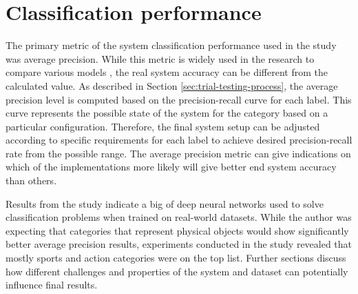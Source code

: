 
\section{Classification performance}
The primary metric of the system classification performance used in the study was average precision. While this metric is widely used in the research to compare various models \cite{Everingham2010PASCAL-VOC}, the real system accuracy can be different from the calculated value. As described in Section \ref{sec:trial-testing-process}, the average precision level is computed based on the precision-recall curve for each label. This curve represents the possible state of the system for the category based on a particular configuration. Therefore, the final system setup can be adjusted according to specific requirements for each label to achieve desired precision-recall rate from the possible range. The average precision metric can give indications on which of the implementations more likely will give better end system accuracy than others.

Results from the study indicate a big of deep neural networks used to solve classification problems when trained on real-world datasets. While the author was expecting that categories that represent physical objects would show significantly better average precision results, experiments conducted in the study revealed that mostly sports and action categories were on the top list. Further sections discuss how different challenges and properties of the system and dataset can potentially influence final results.





